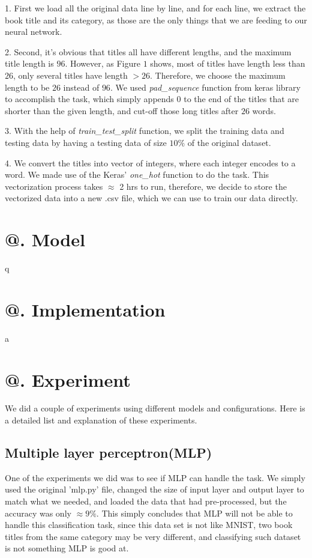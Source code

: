\documentclass[jou,apacite, 10px]{apa6}
\makeatletter
\newcommand*{\rom}[1]{\expandafter\@slowromancap\romannumeral #1@}
\makeatother
\begin{document}
\rule{0pt}{4ex}  1. First we load all the original data line by line, and for each line, we extract the book title and its category, as those are the only things that we are feeding to our neural network.

\rule{0pt}{4ex}  2. Second, it's obvious that titles all have different lengths, and the maximum title length is $96$. However, as Figure $1$ shows, most of titles have length less than $26$, only several titles have length $>26$. Therefore, we choose the maximum length to be $26$ instead of $96$. We used \textit{pad\_sequence} function from keras library to accomplish the task, which simply appends $0$ to the end of the titles that are shorter than the given length, and cut-off those long titles after $26$ words.

\rule{0pt}{4ex}  3. With the help of \textit{train\_test\_split} function, we split the training data and testing data by having a testing data of size $10\%$ of the original dataset.

\rule{0pt}{4ex}  4. We convert the titles into vector of integers, where each integer encodes to a word. We made use of the Keras' \textit{one\_hot} function to do the task. This vectorization process takes $\approx$ 2 hrs to run, therefore, we decide to store the vectorized data into a new .csv file, which we can use to train our data directly.

\section{\rom{3}. Model}
q
\section{\rom{4}. Implementation}
a
\section{\rom{5}. Experiment}
We did a couple of experiments using different models and configurations. Here is a detailed list and explanation of these experiments.

\subsection{Multiple layer perceptron(MLP)}
One of the experiments we did was to see if MLP can handle the task. We simply used the original 'mlp.py' file, changed the size of input layer and output layer to match what we needed, and loaded the data that had pre-processed, but the accuracy was only $\approx 9\%$. This simply concludes that MLP will not be able to handle this classification task, since this data set is not like MNIST, two book titles from the same category may be very different, and classifying such dataset is not something MLP is good at.
\end{document}

